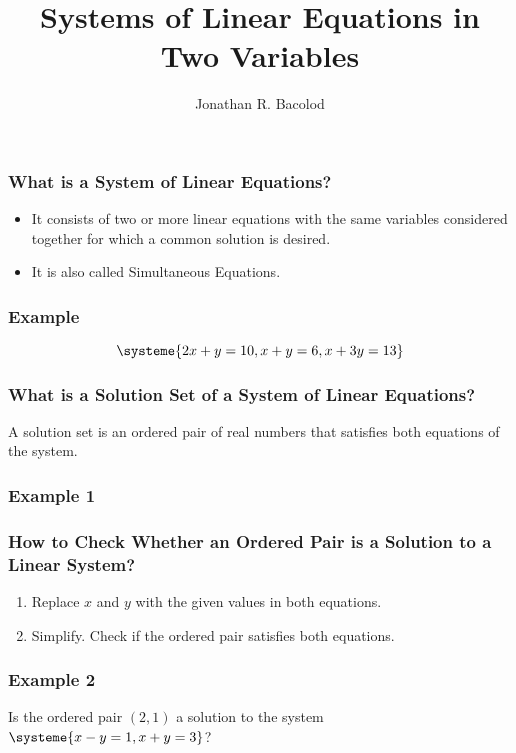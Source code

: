 \documentclass[14pt]{beamer}
\title[] {Systems of Linear Equations in Two Variables}
\author{Jonathan R. Bacolod}
\institute[SHS]{Sauyo High School}
\date{}
\begin{document}
	\frame{\titlepage}
		
	\begin{frame}
		\frametitle{What is a System of Linear Equations?}

		\begin{itemize}
			\item It consists of two or more linear equations with the same variables considered together for which a common solution is desired.
			\item \pause It is also called Simultaneous Equations.
		\end{itemize}
	\end{frame}

    \begin{frame}
    	\frametitle{Example}
    	\[
\systeme{2x+y=10, x+y=6, x+3y=13}
\]
    \end{frame}

    \begin{frame}
    	\frametitle{What is a Solution Set of a System of Linear Equations?}
    	A solution set is an ordered pair of real numbers that satisfies both equations of
    	the system.
    \end{frame}

   \begin{frame}
   	\frametitle{Example 1}
   \end{frame}

    \begin{frame}
    	\frametitle{How to Check Whether an Ordered Pair is a Solution to a Linear System?}
    	\begin{enumerate}
    		\item Replace $ x $ and $ y $ with the given values in both equations.
    		\item \pause Simplify. Check if the ordered pair satisfies both equations.
    	\end{enumerate}
    \end{frame}

     \begin{frame}
    	\frametitle{Example 2}
    	Is the ordered pair $ (2, 1) $ a solution to the system $ \systeme{x - y = 1, x + y = 3} $?
    \end{frame}
\end{document}
